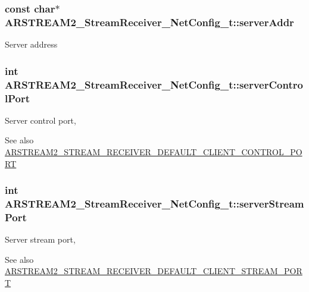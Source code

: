 \subsubsection[{\texorpdfstring{server\+Addr}{serverAddr}}]{\setlength{\rightskip}{0pt plus 5cm}const char$\ast$ A\+R\+S\+T\+R\+E\+A\+M2\+\_\+\+Stream\+Receiver\+\_\+\+Net\+Config\+\_\+t\+::server\+Addr}\hypertarget{struct_a_r_s_t_r_e_a_m2___stream_receiver___net_config__t_ab60053709c2af390bc2031d8176ff709}{}\label{struct_a_r_s_t_r_e_a_m2___stream_receiver___net_config__t_ab60053709c2af390bc2031d8176ff709}
Server address 
\subsubsection[{\texorpdfstring{server\+Control\+Port}{serverControlPort}}]{\setlength{\rightskip}{0pt plus 5cm}int A\+R\+S\+T\+R\+E\+A\+M2\+\_\+\+Stream\+Receiver\+\_\+\+Net\+Config\+\_\+t\+::server\+Control\+Port}\hypertarget{struct_a_r_s_t_r_e_a_m2___stream_receiver___net_config__t_ad679e66ae443af8114bc24ff944fe9d2}{}\label{struct_a_r_s_t_r_e_a_m2___stream_receiver___net_config__t_ad679e66ae443af8114bc24ff944fe9d2}
Server control port, \begin{DoxySeeAlso}{See also}
\hyperlink{arstream2__stream__receiver_8h_a83f798f5a0bbe9c8013bc27a95b4c2e1}{A\+R\+S\+T\+R\+E\+A\+M2\+\_\+\+S\+T\+R\+E\+A\+M\+\_\+\+R\+E\+C\+E\+I\+V\+E\+R\+\_\+\+D\+E\+F\+A\+U\+L\+T\+\_\+\+C\+L\+I\+E\+N\+T\+\_\+\+C\+O\+N\+T\+R\+O\+L\+\_\+\+P\+O\+RT} 
\end{DoxySeeAlso}
\subsubsection[{\texorpdfstring{server\+Stream\+Port}{serverStreamPort}}]{\setlength{\rightskip}{0pt plus 5cm}int A\+R\+S\+T\+R\+E\+A\+M2\+\_\+\+Stream\+Receiver\+\_\+\+Net\+Config\+\_\+t\+::server\+Stream\+Port}\hypertarget{struct_a_r_s_t_r_e_a_m2___stream_receiver___net_config__t_a209ff0815b72c583d3a5f2cac2c7e14f}{}\label{struct_a_r_s_t_r_e_a_m2___stream_receiver___net_config__t_a209ff0815b72c583d3a5f2cac2c7e14f}
Server stream port, \begin{DoxySeeAlso}{See also}
\hyperlink{arstream2__stream__receiver_8h_a9d531a5704f329e46a60e91170cce4b4}{A\+R\+S\+T\+R\+E\+A\+M2\+\_\+\+S\+T\+R\+E\+A\+M\+\_\+\+R\+E\+C\+E\+I\+V\+E\+R\+\_\+\+D\+E\+F\+A\+U\+L\+T\+\_\+\+C\+L\+I\+E\+N\+T\+\_\+\+S\+T\+R\+E\+A\+M\+\_\+\+P\+O\+RT} 
\end{DoxySeeAlso}


